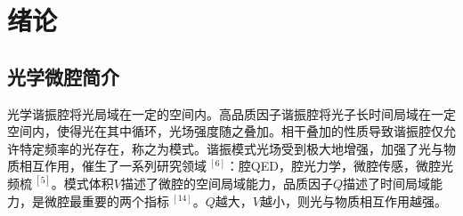 \chapter{绪论}
\label{chap:introduction}

\fontsize{12bp}{14.4pt}


\section{光学微腔简介}
光学谐振腔将光局域在一定的空间内。高品质因子谐振腔将光子长时间局域在一定空间内，使得光在其中循环，光场强度随之叠加。相干叠加的性质导致谐振腔仅允许特定频率的光存在，称之为模式。谐振模式光场受到极大地增强，加强了光与物质相互作用，催生了一系列研究领域$~^{[6]}$：腔QED，腔光力学，微腔传感，微腔光频梳$~^{[5]}$。模式体积$V$描述了微腔的空间局域能力，品质因子$Q$描述了时间局域能力，是微腔最重要的两个指标$~^{[14]}$。$Q$越大，$V$越小，则光与物质相互作用越强。
